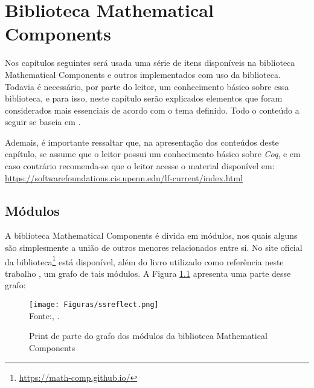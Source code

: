 \chapter{Biblioteca Mathematical Components}
\label{cap:mathcomp}

Nos capítulos seguintes será usada uma série de itens disponíveis na biblioteca Mathematical Components e outros implementados com uso da biblioteca. Todavia é necessário, por parte do leitor, um conhecimento básico sobre essa biblioteca, e para isso, neste capítulo serão explicados elementos que foram considerados mais essenciais de acordo com o tema definido. Todo o conteúdo a seguir se baseia em \cite{assia_mahboubi_2022_7118596}.

Ademais, é importante ressaltar que, na apresentação dos conteúdos deste capítulo, se assume que o leitor possui um conhecimento básico sobre \textit{Coq}, e em caso contrário recomenda-se que o leitor acesse o material disponível em: \url{https://softwarefoundations.cis.upenn.edu/lf-current/index.html}

\section{Módulos}
A biblioteca Mathematical Components é divida em módulos, nos quais alguns são simplesmente a união de outros menores relacionados entre si. No site oficial da biblioteca\footnote{\url{https://math-comp.github.io/}} está disponível, além do livro utilizado como referência neste trabalho \cite{assia_mahboubi_2022_7118596}, um grafo
de tais módulos. A Figura \ref{fig:graph-mathcomp} apresenta uma parte desse grafo:

\begin{figure}[h]
    \centering
    \caption{Print de parte do grafo dos módulos da biblioteca Mathematical Components}
    \texttt{[image: Figuras/ssreflect.png]}\\
    \footnotesize{Fonte:\citeauthor{grafo-ssreflect}, \citeyear{grafo-ssreflect}.
    }
    \label{fig:graph-mathcomp}
\end{figure}


